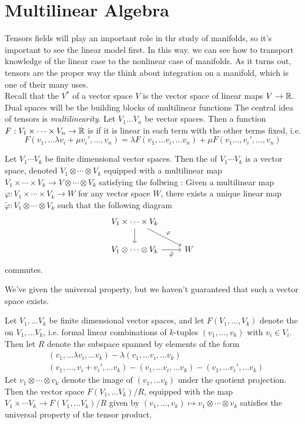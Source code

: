 %
\section{Multilinear Algebra}
%
Tensors fields will play an important role in thr study of manifolds, so
it's important to see the linear model first. In this way. we can see how
to transport knowledge of the linear case to the nonlinear case of
manifolds. As it turns out, tensors are the proper way the think about
integration on a manifold, which is one of their many uses. \\
%
Recall that the  $V^*$ of a vector space $V$ is the vector space
of linear maps $V \to \mathbb{R}$. Dual spaces will be the building blocks of
multilinear functions The central idea of tensors is \emph{multilinearity}.
Let $V_1 \ldots V_n$ be vector spaces. Then a function
$F : V_1 \times \cdots \times V_n \to \mathbb{R}$ is  if it is linear
in each term with the other terms fixed, i.e.
$$F(v_1, \ldots \lambda v_i + \mu v_i', \ldots, v_n) =
\lambda F(v_1, \ldots v_i, \ldots v_n) +
\mu F(v_1 \ldots, v_i', \ldots, v_n)$$
%
\begin{defn}
Let $V_1 \cdots V_k$ be finite dimensional vector spaces. Then the
 of $V_1 \cdots V_k$ is a vector space, denoted
$V_1 \otimes \cdots \otimes V_k$ equipped with a multilinear map
$V_1 \times \cdots \times V_k \to V \otimes \cdots \otimes V_k$ satisfying
the follwing  : Given a multilinear map
$\varphi : V_1 \times \cdots \times V_k \to W$ for any vector space $W$,
there exists a unique linear map
$\tilde{\varphi} : V_1 \otimes \cdots \otimes V_k$ such that the following
diagram
$$\begin{tikzcd}
V_1 \times \cdots \times V_k \ar[dr, "\varphi"] \ar[d] \\
V_1 \otimes \cdots \otimes V_k \ar[r, "\tilde{\varphi}"'] & W
\end{tikzcd}$$
commutes.
\end{defn}
%
We've given the universal property, but we haven't guaranteed that such
a vector space exists.
%
\begin{thm}
Let $V_1, \ldots V_k$ be finite dimensional vector spaces, and let
$F(V_1, \ldots, V_k)$ denote the  on
$V_1, \ldots V_k$, i.e. formal linear combinations of $k$-tuples
$(v_1,\ldots,v_k)$ with $v_i \in V_i$. Then let $R$ denote the subspace
spanned by elements of the form
\begin{align*}
&(v_1, \ldots \lambda v_i, \ldots v_k) -
\lambda (v_1, \ldots v_i, \ldots v_k)\\
&(v_1, \ldots, v_i + v_i', \ldots v_k) - (v_1, \ldots v_i, \ldots v_k)
- (v_1, \ldots v_i', \ldots v_k)
\end{align*}
Let $v_1 \otimes \cdots \otimes v_k$ denote the image of $(v_1, \ldots v_k)$
under the quotient projection. Then the vector space $F(V_1, \ldots V_k) / R$,
equipped with the map $V_1 \times \cdots V_k \to F(V_1, \ldots V_k) / R$ given
by $(v_1, \ldots, v_k) \mapsto v_1 \otimes \cdots \otimes v_k$ satisfies the
universal property of the tensor product.
\end{thm}
